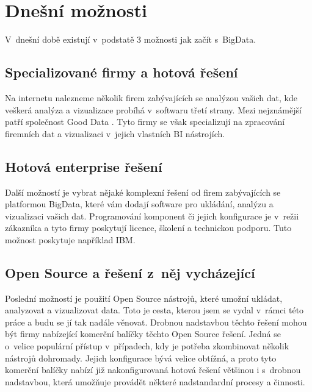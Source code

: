 \section{Dnešní možnosti}
V~dnešní době existují v~podstatě 3 možnosti jak začít s~BigData. 

\subsection{Specializované firmy a hotová řešení}
Na internetu nalezneme několik firem zabývajících se analýzou vašich dat, kde veškerá analýza a vizualizace probíhá v~softwaru třetí strany. Mezi nejznámější patří společnost Good Data \cite{gooddata}. Tyto firmy se však specializují na zpracování firemních dat a vizualizaci v~jejich vlastních BI nástrojích.

\subsection{Hotová enterprise řešení}
Další možností je vybrat nějaké komplexní řešení od firem zabývajících se platformou BigData, které vám dodají software pro ukládání, analýzu a vizualizaci vašich dat. Programování komponent či jejich konfigurace je v~režii zákazníka a tyto firmy poskytují licence, školení a technickou podporu. Tuto možnost poskytuje například IBM.

\subsection{Open Source a řešení z~něj vycházející} 
Poslední možností je použití Open Source nástrojů, které umožní ukládat, analyzovat a vizualizovat data. Toto je cesta, kterou jsem se vydal v~rámci této práce a budu se jí tak nadále věnovat. Drobnou nadstavbou těchto řešení mohou být firmy nabízející komerční balíčky těchto Open Source řešení. Jedná se o~velice populární přístup v~případech, kdy je potřeba zkombinovat několik nástrojů dohromady. Jejich konfigurace bývá velice obtížná, a proto tyto komerční balíčky nabízí již nakonfigurovaná hotová řešení většinou i s~drobnou nadstavbou, která umožňuje provádět některé nadstandardní procesy a činnosti. 
